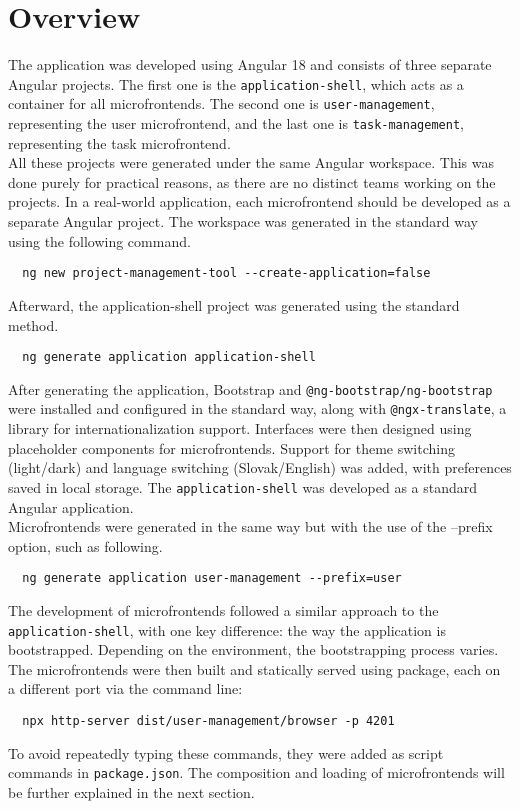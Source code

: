 \section{Overview}
The application was developed using Angular 18 and consists of three separate Angular projects. The first one is the \texttt{application-shell}, which acts as a container for all microfrontends. The second one is \texttt{user-management}, representing the user microfrontend, and the last one is \texttt{task-management}, representing the task microfrontend.\\

\noindent
All these projects were generated under the same Angular workspace. This was done purely for practical reasons, as there are no distinct teams working on the projects. In a real-world application, each microfrontend should be developed as a separate Angular project. The workspace was generated in the standard way using the following command.
\begin{verbatim}
  ng new project-management-tool --create-application=false
\end{verbatim}
Afterward, the application-shell project was generated using the standard method.
\begin{verbatim}
  ng generate application application-shell
\end{verbatim}
After generating the application, Bootstrap and \texttt{@ng-bootstrap/ng-bootstrap} were installed and configured in the standard way, along with \texttt{@ngx-translate}, a library for internationalization support. Interfaces were then designed using placeholder components for microfrontends. Support for theme switching (light/dark) and language switching (Slovak/English) was added, with preferences saved in local storage. The \texttt{application-shell} was developed as a standard Angular application. \\

\noindent
Microfrontends were generated in the same way but with the use of the --prefix option, such as following.
\begin{verbatim}
  ng generate application user-management --prefix=user
\end{verbatim}
The development of microfrontends followed a similar approach to the \texttt{application-shell}, with one key difference: the way the application is bootstrapped. Depending on the environment, the bootstrapping process varies. The microfrontends were then built and statically served using  package, each on a different port via the command line:
\begin{verbatim}
  npx http-server dist/user-management/browser -p 4201
\end{verbatim}
To avoid repeatedly typing these commands, they were added as script commands in \texttt{package.json}. The composition and loading of microfrontends will be further explained in the next section. \\

